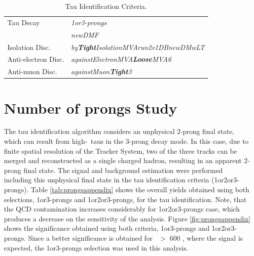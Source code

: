 \begin{table}[H]
    \begin{center}
    \begin{tabular}{l|l} \hline \hline 
 Tau Decay               & \textit{1or3-prongs} \\
                        & \textit{newDMF} \\
 Isolation Disc.        & \textit{by\textbf{Tight}IsolationMVArun2v1DBnewDMwLT} \\
 Anti-electron Disc.    & \textit{againstElectronMVA\textbf{Loose}MVA6} \\
 Anti-muon Disc.        & \textit{againstMuon\textbf{Tight}3} \\ \hline \hline 
  \end{tabular}
  \end{center}
  \caption{Tau Identification Criteria. \label{tab:tauIDappendix}}
\end{table}



\section{Number of prongs Study}
\label{Results:TauID-nprongs}

\noindent The tau identification algorithm considers an 
unphysical 2-prong final state, which can result from 
high-\pt~taus in the 3-prong decay mode. In this case,
due to finite spatial resolution of the Tracker System, two of the 
three tracks can be merged and reconstructed as a single charged 
hadron, resulting in an apparent 2-prong final state. The signal 
and background estimation were performed including this 
unphysical final state in the tau identification criteria (1or2or3-prongs).
Table \ref{tab:prongsappendix} shows the overall yields obtained 
using both selections, 1or3-prongs and 1or2or3-prongs, for the tau 
identification. Note, that the QCD contamination increases considerably for 1or2or3-prongs case, which 
produces a decrease on the sensitivity of the analysis. Figure \ref{fig:prongsappendix} shows 
the significance obtained using both criteria, 1or3-prongs and 1or2or3-prongs. Since a better 
significance is obtained for \mass~$>$ 600 \GeV, where the signal is expected, 
the 1or3-prongs selection was used in this analysis.

